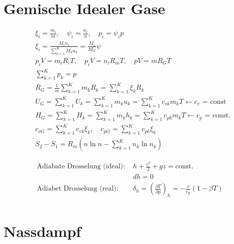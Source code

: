 \documentclass[twocolumn]{article}
\begin{document}
\section{Gemische Idealer Gase}

\begin{align*}
	&\xi_i = \frac{m_i}{m}, \quad \psi_i = \frac{n_i}{n}, \quad p_i = \psi_ip \\
	&\xi_i = \frac{M_i n_i}{\sum_{k = 1}^{K} M_kn_k} = \frac{M_i}{M_G}\psi  \\
	& p_iV = m_iR_iT, \quad p_iV = n_iR_mT, \quad pV = mR_GT \\
	& \sum_{k = 1}^{K} p_k = p \\
	&R_G = \frac{1}{m} \sum_{k=1}^{K} m_kR_k = \sum_{k=1}^{K} \xi_k R_k \\
	&U_G = \sum_{k=1}^{K} U_k = \sum_{k=1}^{K} m_k u_k = \sum_{k=1}^{K} c_{vk}m_kT \leftarrow \text{$c_v$ = const}\\
	&H_G = \sum_{k=1}^{K} H_k = \sum_{k=1}^{K} m_k h_k = \sum_{k=1}^{K} c_{pk}m_kT \leftarrow \text{$c_p$ = const.}\\
	&c_{vG} = \sum_{k=1}^{K} c_{vk} \xi_k, \quad c_{pG} = \sum_{k=1}^{K} c_{pk}\xi_k \\
	&S_2-S_1 = R_m \left( n \ln n - \sum_{k=1}^{K} n_k \ln n_k \right)
\end{align*}

\begin{align*}
	\text{Adiabate Drosselung (ideal): } &h + \frac{c^2}{2} + gz = \text{const.} \\
	&dh = 0 \\
	\text{Adiabet Drosselung (real): } &\delta_h = \left(\frac{\partial T}{\partial p}\right)_{h}  = - \frac{v}{c_p}(1-\beta T) \\
\end{align*}
\pagebreak
\section{Nassdampf}
\end{document}

